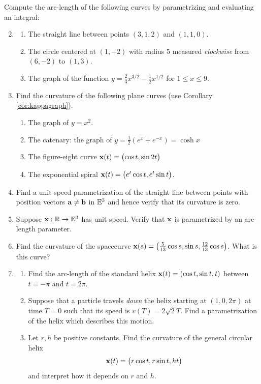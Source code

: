 \begin{exercises}
\exstart Compute the arc-length of the following curves by parametrizing and evaluating an integral:\vspace{-5pt}

\begin{enumerate}\setcounter{enumi}{1}
  \item[]\begin{enumerate}
    \item The straight line between points $(3,1,2)$ and $(1,1,0)$.
    \item The circle centered at $(1,-2)$ with radius 5 measured \emph{clockwise} from $(6,-2)$ to $(1,3)$.
    \item The graph of the function $y=\frac 23x^{3/2}-\frac 12x^{1/2}$ for $1\le x\le 9$.
  \end{enumerate}
  
  \item Find the curvature of the following plane curves (use Corollary \ref{cor:kappagraph}).
  \begin{enumerate}
    \item The graph of $y=x^2$.
    \item The catenary: the graph of $y=\frac 12(e^x+e^{-x})=\cosh x$
    \item The figure-eight curve ${\mathbf{x}}(t)=\bigl(\cos t,\sin 2t\bigr)$
    \item\label{exs:expspiral} The exponential spiral ${\mathbf{x}}(t)=\bigl(e^t\cos t,e^t\sin t\bigr)$.
  \end{enumerate}
  
  \item Find a unit-speed parametrization of the straight line between points with position vectors ${\mathbf{a}}\neq {\mathbf{b}}$ in $\mathbb{E}^3$ and hence verify that its curvature is zero.
  	
	\item Suppose ${\mathbf{x}}:\mathbb{R}\to\mathbb{E}^3$ has unit speed. Verify that ${\mathbf{x}}$ is parametrized by an arc-length parameter.

  \item Find the curvature of the spacecurve ${\mathbf{x}}(s)=\left(\frac 5{13}\cos s,\sin s,\frac{12}{13}\cos s\right)$. What is this curve?
  
  \item\begin{enumerate}
		\item Find the arc-length of the standard helix ${\mathbf{x}}(t)=\left(\cos t,\sin t,t\right)$ between $t=-\pi$ and $t=2\pi$.
		\item Suppose that a particle travels \emph{down} the helix starting at $(1,0,2\pi)$ at time $T=0$ such that its speed is $v(T)=2\sqrt{2}T$. Find a parametrization of the helix which describes this motion.
		\item Let $r,h$ be positive constants. Find the curvature of the general circular helix
		\[{\mathbf{x}}(t)=\bigl(r\cos t,r\sin t,ht\bigr)\]
		and interpret how it depends on $r$ and $h$.
\end{enumerate}


\end{enumerate}
\end{exercises}
